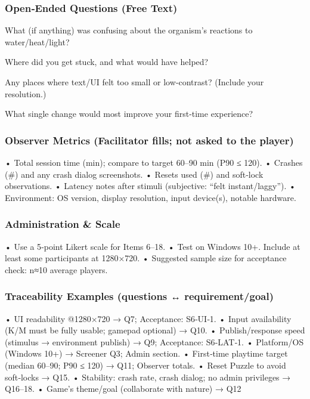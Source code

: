 \documentclass[12pt, titlepage]{article}
\begin{document}
\subsubsection{Open‑Ended Questions (Free Text)}

What (if anything) was confusing about the organism’s reactions to water/heat/light?

Where did you get stuck, and what would have helped?

Any places where text/UI felt too small or low‑contrast? (Include your resolution.)

What single change would most improve your first‑time experience?

\subsubsection{Observer Metrics (Facilitator fills; not asked to the player)}

• Total session time (min); compare to target 60–90 min (P90 ≤ 120).
 • Crashes (\#) and any crash dialog screenshots.
 • Resets used (\#) and soft‑lock observations.
 • Latency notes after stimuli (subjective: “felt instant/laggy”).
 • Environment: OS version, display resolution, input device(s), notable hardware.

\subsubsection{Administration \& Scale}

• Use a 5‑point Likert scale for Items 6–18.
 • Test on Windows 10+. Include at least some participants at 1280×720.
 • Suggested sample size for acceptance check: n≈10 average players.

\subsubsection{Traceability Examples (questions ↔ requirement/goal)}

• UI readability @1280×720 → Q7; Acceptance: S6‑UI‑1.
 • Input availability (K/M must be fully usable; gamepad optional) → Q10.
 • Publish/response speed (stimulus → environment publish) → Q9; Acceptance: S6‑LAT‑1.
 • Platform/OS (Windows 10+) → Screener Q3; Admin section.
 • First‑time playtime target (median 60–90; P90 ≤ 120) → Q11; Observer totals.
 • Reset Puzzle to avoid soft‑locks → Q15.
 • Stability: crash rate, crash dialog; no admin privileges → Q16–18.
 • Game’s theme/goal (collaborate with nature) → Q12
\end{document}
